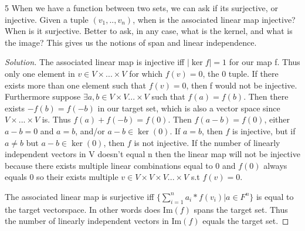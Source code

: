 \documentclass{article}
\newcommand{\abs}[1]{\lvert #1\rvert}
\newcommand{\IM}[1]{\text{Im}(#1)}
\newenvironment{solution}
  {\renewcommand\qedsymbol{$\blacksquare$}\begin{proof}[Solution]}
  {\end{proof}}
\begin{document}
\begin{PROB}{5}\label{Problem 5.}
    When we have a function between two sets, we can ask if its surjective, or injective. Given a tuple $(v_1,..,v_n)$, when is the associated linear map injective? When is it surjective. Better to ask, in any case, what is the kernel, and what is the image? This gives us the notions of span and linear independence. 
\end{PROB}
\begin{solution}
	The associated linear map is injective iff $\abs{\ker{f}} = 1$ for our map f. Thus only one element in $v \in V \times ... \times V$ for which $f(v) = 0$, the 0 tuple. If there exists more than one element such that $f(v) = 0$, then f would not be injective. Furthermore suppose $\exists a, b \in V \times V ... \times V$ such that $f(a) = f(b)$. Then there exists $-f(b) = f(-b)$ in our target set, which is also a vector space since $V \times ... \times V$ is. Thus $f(a) + f(-b) = f(0)$. Then $f(a - b) = f(0)$, either $a - b = 0$ and $a = b$, and/or $a - b \in \ker(0)$. If $a = b$, then $f$ is injective, but if $a \neq b$ but $a - b \in \ker(0)$, then $f$ is not injective. If the number of linearly independent vectors in V doesn't equal n then the linear map will not be injective because there exists multiple linear combinations equal to 0 and $f(0)$ always equals 0 so their exists multiple $v \in V \times V \times V ... \times V$ s.t $f(v) = 0$.

	The associated linear map is surjective iff $\{\sum_{i = 1}^{n} a_i * f(v_i) | a \in F^n\}$ is equal to the target vectorspace. In other words does $\IM{f}$ spans the target set. Thus the number of linearly independent vectors in $\IM{f}$ equals the target set.
\end{solution}

\bigskip
\end{document}
